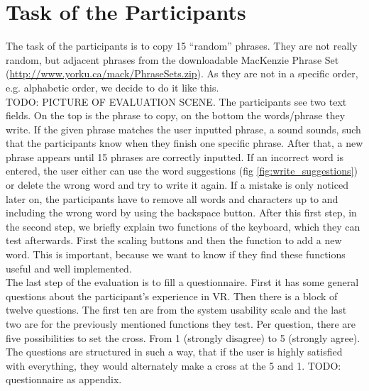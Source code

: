 \section{Task of the Participants}
The task of the participants is to copy 15 ``random'' phrases. They are not really random, but adjacent phrases from the downloadable MacKenzie Phrase Set (\url{http://www.yorku.ca/mack/PhraseSets.zip}). As they are not in a specific order, e.g. alphabetic order, we decide to do it like this.\\
TODO: PICTURE OF EVALUATION SCENE.
The participants see two text fields. On the top is the phrase to copy, on the bottom the words/phrase they write. If the given phrase matches the user inputted phrase, a sound sounds, such that the participants know when they finish one specific phrase. After that, a new phrase appears until 15 phrases are correctly inputted. If an incorrect word is entered, the user either can use the word suggestions (fig \ref{fig:write_suggestions}) or delete the wrong word and try to write it again. If a mistake is only noticed later on, the participants have to remove all words and characters up to and including the wrong word by using the backspace button.
\label{sec:eva_task}
After this first step, in the second step, we briefly explain two functions of the keyboard, which they can test afterwards. First the scaling buttons and then the function to add a new word. This is important, because we want to know if they find these functions useful and well implemented.\\
The last step of the evaluation is to fill a questionnaire. First it has some general questions about the participant's experience in VR. Then there is a block of twelve questions. The first ten are from the system usability scale and the last two are for the previously mentioned functions they test. Per question, there are five possibilities to set the cross. From 1 (strongly disagree) to 5 (strongly agree). The questions are structured in such a way, that if the user is highly satisfied with everything, they would alternately make a cross at the 5 and 1. TODO: questionnaire as appendix.

